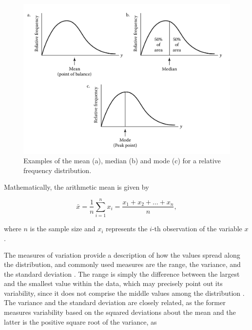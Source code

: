 \begin{figure}[H]
	\centering
	\caption{\label{fig:central_tendency} Examples of the mean (a), median (b) and mode (c) for a relative frequency distribution.}
	\begin{center}
    \includegraphics[scale=0.4]{images/central_tendency.png}
	\end{center}
	\centering
\end{figure}

Mathematically, the arithmetic mean is given by

\begin{equation}
\label{eqn:arithmetic_mean}
\bar{x} = \frac{1}{n} \sum_{i=1}^{n} x_{i} = \frac{x_{1} + x_{2} + \dots + x_{n}}{n},
\end{equation}

\noindent where $n$ is the sample size and $x_{i}$ represents the $i$-th observation of the variable $x$ \cite{zwillinger1999crc}.


The measures of variation provide a description of how the values spread along the distribution, and commonly used measures are the range, the variance, and the standard deviation \cite{mendenhall2016statistics}. The range is simply the difference between the largest and the smallest value within the data, which may precisely point out its variability, since it does not comprise the middle values among the distribution \cite{devore2011probability}. The variance and the standard deviation are closely related, as the former measures variability based on the squared deviations about
the mean and the latter is the positive square root of the variance, as

